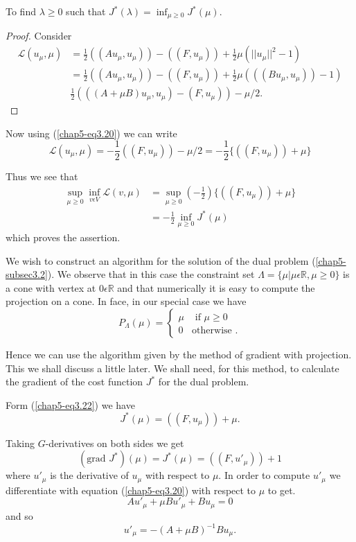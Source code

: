 \medskip
{} To find $\lambda \geq 0$ such that $J^{*} (\lambda) = \inf_{\mu \geq 0} J^{*} (\mu)$.

\begin{proof}
Consider
\begin{align*}
\mathscr{L} (u_{\mu}, \mu) & = \frac{1}{2} ((A u_{\mu}, u_{\mu})) - ((F, u_{\mu})) + \frac{1}{2} \mu (||u_{\mu}||^{2} - 1)\\
& = \frac{1}{2} ((A u_{\mu}, u_{\mu})) - ((F, u_{\mu})) + \frac{1}{2} \mu (((B u_{\mu}, u_{\mu})) - 1)\\
& \frac{1}{2} (((A + \mu B) u_{\mu}, u_{\mu}) - (F, u_{\mu})) - \mu/2.
\end{align*}\pageoriginale
\end{proof}

Now using (\ref{chap5-eq3.20}) we can write
$$
\mathscr{L} (u_{\mu}, \mu) = - \frac{1}{2} ((F, u_{\mu})) - \mu/2 = -\frac{1}{2} \{ ((F, u_{\mu})) + \mu \}
$$

Thus we see that
\begin{align*}
\sup_{\mu \geq 0} \inf_{v \epsilon V} \mathscr{L} (v, \mu) & = \sup_{\mu \geq 0} (-\frac{1}{2}) \{((F, u_{\mu})) + \mu \}\\
& = -\frac{1}{2} \inf_{\mu \geq 0} J^{*} (\mu)
\end{align*}
which proves the assertion.

We wish to construct an algorithm for the solution of the dual problem (\ref{chap5-subsec3.2}). We observe that in this case the constraint set $\Lambda = \{\mu | \mu \epsilon \mathbb{R}, \mu \geq 0 \}$ is a cone with vertex at $0 \epsilon \mathbb{R}$ and that numerically it is easy to compute the projection on a cone. In face, in our special case we have
\begin{equation*}
P_{\Lambda} (\mu) = 
\begin{cases}
\mu & \text{ if } \mu \geq 0\\
0 & \text{otherwise }.
\end{cases}
\end{equation*}

Hence we can use the algorithm given by the method of gradient with projection. This we shall discuss a little later. We shall need, for this method, to calculate the gradient of the cost function $J^{*}$ for the dual problem.

Form (\ref{chap5-eq3.22}) we have
$$
J^{*} (\mu) = ((F, u_{\mu})) + \mu.
$$

Taking $G$-derivatives on both sides we get
\begin{equation*}
(\text{grad } J^{*}) (\mu) = J^{*}(\mu) = ((F, u'_{\mu})) + 1\tag{3.23}\label{chap5-eq3.23}
\end{equation*}
where $u'_{\mu}$ is the derivative of $u_{\mu}$ with respect to $\mu$. In order to compute $u'_{\mu}$ we differentiate with equation (\ref{chap5-eq3.20}) with respect to $\mu$ to get.
$$
A u'_{\mu} + \mu B u'_{\mu} + B u_{\mu} = 0
$$\pageoriginale
and so
\begin{equation*}
u'_{\mu} = -(A + \mu B)^{-1} B u_{\mu}.\tag{3.24}\label{chap5-eq3.24}
\end{equation*}

